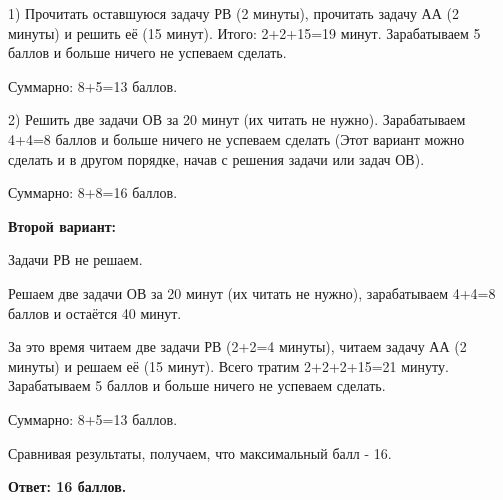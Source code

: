 1) Прочитать оставшуюся задачу РВ (2 минуты), прочитать задачу АА (2 минуты) и решить её (15 минут). Итого: 2+2+15=19 минут. Зарабатываем 5 баллов и больше ничего не успеваем сделать.

Суммарно: 8+5=13 баллов.

2) Решить две задачи ОВ за 20 минут (их читать не нужно). Зарабатываем 4+4=8 баллов и больше ничего не успеваем сделать (Этот вариант можно сделать и в другом порядке, начав с решения задачи или задач ОВ).

Суммарно: 8+8=16 баллов.

\textbf{Второй вариант:}

Задачи РВ не решаем.

Решаем две задачи ОВ за 20 минут (их читать не нужно), зарабатываем 4+4=8 баллов и остаётся 40 минут.

За это время читаем две задачи РВ (2+2=4 минуты), читаем задачу АА (2 минуты) и решаем её (15 минут). Всего тратим 2+2+2+15=21 минуту. Зарабатываем 5 баллов и больше ничего не успеваем сделать.

Суммарно: 8+5=13 баллов.

Сравнивая результаты, получаем, что максимальный балл - 16.

\textbf{Ответ: 16 баллов.}



